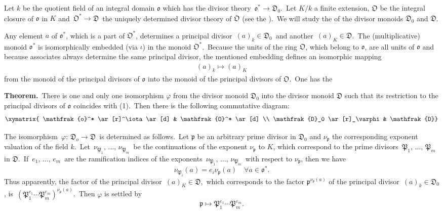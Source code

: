 \documentclass[12pt]{article}
\begin{document}
Let $k$ be the quotient field of an integral domain $\mathfrak{o}$ which has the divisor theory \,$\mathfrak{o}^* \to \mathfrak{D}_0$.\, Let $K/k$ a finite extension, $\mathfrak{O}$ be the integral closure of $\mathfrak{o}$ in $K$ and\, $\mathfrak{O}^* \to \mathfrak{D}$\, the uniquely determined divisor theory of $\mathfrak{O}$ (see the ).\, We will study the  of the divisor monoids $\mathfrak{D}_0$ and $\mathfrak{D}$.

Any element $a$ of $\mathfrak{o}^*$, which is a part of $\mathfrak{O}^*$, determines a principal divisor \,$(a)_k \in \mathfrak{D}_0$\, and another\, $(a)_K \in \mathfrak{D}$.\, The (multiplicative) monoid $\mathfrak{o}^*$ is isomorphically embedded (via $\iota$) in the monoid $\mathfrak{O}^*$.\, Because the units of the ring $\mathfrak{O}$, which belong to $\mathfrak{o}$, are all units of $\mathfrak{o}$ and because associates always determine the same principal divisor, the mentioned embedding defines an isomorphic mapping
\begin{align}
(a)_k \mapsto (a)_K
\end{align}
from the monoid of the principal divisors of $\mathfrak{o}$ into the monoid of the principal divisors of $\mathfrak{O}$.\, One has the

\textbf{Theorem.}\, There is one and only one isomorphism $\varphi$ from the divisor monoid $\mathfrak{D}_0$ into the divisor monoid $\mathfrak{D}$ such that its restriction to the principal divisors of $\mathfrak{o}$ coincides with (1).\, Then there is the following commutative diagram:
$$\xymatrix{
\mathfrak{o}^* \ar[r]^\iota \ar[d] & \mathfrak{O}^* \ar[d] \\
\mathfrak{D}_0 \ar[r]_\varphi & \mathfrak{D}}
$$


The isomorphism\, $\varphi\!:\,\mathfrak{D}_o \to \mathfrak{D}$\, is determined as follows.\, Let $\mathfrak{p}$ be an arbitrary prime divisor in $\mathfrak{D}_0$ and $\nu_\mathfrak{p}$ the corresponding exponent valuation of the field $k$.\, Let\, $\nu_{\mathfrak{P}_1},\,\ldots,\,\nu_{\mathfrak{P}_m}$\, be the continuations of the exponent $\nu_\mathfrak{p}$ to $K$, which correspond to the prime divisors\, $\mathfrak{P}_1,\,\ldots,\,\mathfrak{P}_m$ in $\mathfrak{D}$.\, If\, $e_1,\,\ldots,\,e_m$\, are the ramification indices of the exponents \,$\nu_{\mathfrak{P}_1},\,\ldots,\,\nu_{\mathfrak{P}_m}$\, with respect to $\nu_\mathfrak{p}$, then we have
$$\nu_{\mathfrak{P}_i}(a) = e_i\nu_\mathfrak{p}(a) \quad \forall a \in \mathfrak{o}^*.$$
Thus apparently, the factor of the principal divisor \,$(a)_K \in \mathfrak{D}$,\, which corresponds to the factor $\mathfrak{p}^{\nu_\mathfrak{p}(a)}$ of the principal divisor \,$(a)_k \in \mathfrak{D}_0$, is\, $(\mathfrak{P}_1^{e_1}\cdots\mathfrak{P}_m^{e_m})^{\nu_\mathfrak{p}(a)}$.\, Then $\varphi$ is settled by
$$\mathfrak{p} \mapsto \mathfrak{P}_1^{e_1}\cdots\mathfrak{P}_m^{e_m}.$$
\end{document}
